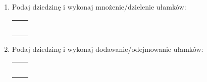 \documentclass[12pt,a4paper]{article}
\begin{document}
\begin{enumerate}[1.]
		\item Podaj dziedzinę i wykonaj mnożenie/dzielenie ułamków:
	\Large
	\begin{enumerate}[a)] \begin{tabular}{p{7cm} p{7cm}} 
			\item $\frac{3x^2-3}{x^2-4x-5} \cdot \frac{7x-35}{2x-2}=$& \vspace{0.4cm} \item $\frac{5x^2+7x+2}{x^2+2x+1}\cdot\frac{3x^2+2x-1}{25x^2-4}= $ \\
			\item $\frac{2x^2+6x}{x^2+4x+4}:\frac{x^2+6x+9}{x^2-4}= $& \item $\frac{x^3-5x^2+2x-10}{x^2+x-30}:\frac{x^3+2x}{x+6}= $ \\
			\item $\frac{x^2-1}{x^2+x-6}\cdot\frac{x^2+7x+12}{x^2+x-2}= $& \item $\frac{5x^2+7x+2}{x^2+2x+1}\cdot\frac{3x^2+2x-1}{25x^2-4}= $ \\
			\item $\frac{x^3+3x^2-x-3}{x^2-1}\cdot\frac{1}{x^2+8x+15}= $& \item $\frac{2x^3+6x^2+x+3}{4x^2+11x-3}\cdot\frac{3x^2+2x-1}{2x^3+2x^2+x+1}= $ \\
			\item $\frac{25x^2-10x+1}{x^2-9}:\frac{10x-2}{5x+15}= $& \item $\frac{x^3-5x^2+2x-10}{x^2+x-30}:\frac{x^3+2x}{x+6}= $ \\
		\end{tabular} \end{enumerate}
	
\newpage
\normalsize
			\item Podaj dziedzinę i wykonaj dodawanie/odejmowanie ułamków:
	\Large
	\begin{enumerate}[a)] \begin{tabular}{p{7cm} p{7cm}} 
			\item $\frac{x+1}{x-5}+\frac{2}{x+1}= $& \vspace{0.4cm} \item $\frac{x-1}{x^2+x-2}+\frac{x+5}{x^2-x-6}= $ \\
			\item $\frac{2x+4}{x+1}-\frac{2x}{x-8}= $& \item $\frac{x-1}{x^2-2x-15}-\frac{-2x-3}{x^2-x-20}= $ \\
			\item $\frac{x-1}{x-3}-\frac{x+1}{x-3}+\frac{x-4}{x-9}= $& \item $\frac{x-2}{x^2-4x}+\frac{x^2-1}{x^2-8x+16}-\frac{1}{2x}= $ \\
			\item $\frac{2x-1}{2x+1}+\frac{2-3x}{2x-1}= $& \item $\frac{1}{x-2}-\frac{1}{x}-\frac{1}{x^2-2x}= $ \\
			\item $\frac{5x}{x^2-6x+9}+\frac{4}{x-3}-\frac{1}{x^+3x}= $& \item $\frac{x-1}{x}-\frac{3}{x^2}+\frac{1}{x+1}= $ \\
	\end{tabular} \end{enumerate}	


\end{enumerate}
\end{document}
